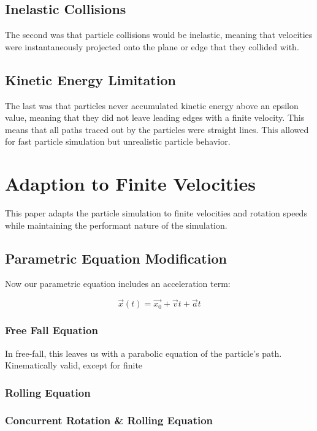 	\subsection{Inelastic Collisions}
The second was that particle collisions would be inelastic, meaning that velocities were instantaneously projected onto the plane or edge that they collided with.



	\subsection{Kinetic Energy Limitation}

The last was that particles never accumulated kinetic energy above an epsilon value, meaning that they did not leave leading edges with a finite velocity. This means that all paths traced out by the particles were straight lines. This allowed for fast particle simulation but unrealistic particle behavior.

\section{Adaption to Finite Velocities}

This paper adapts the particle simulation to finite velocities and rotation speeds while maintaining the performant nature of the simulation.

	\subsection{Parametric Equation Modification}

Now our parametric equation includes an acceleration term:

$$
\vec{x}(t) = \vec{x_0} + \vec{v}t + \vec{a}t
$$

		\subsubsection{Free Fall Equation}
In free-fall, this leaves us with a parabolic equation of the particle's path. Kinematically valid, except for finite


		\subsubsection{Rolling Equation}

		\subsubsection{Concurrent Rotation \& Rolling Equation}

